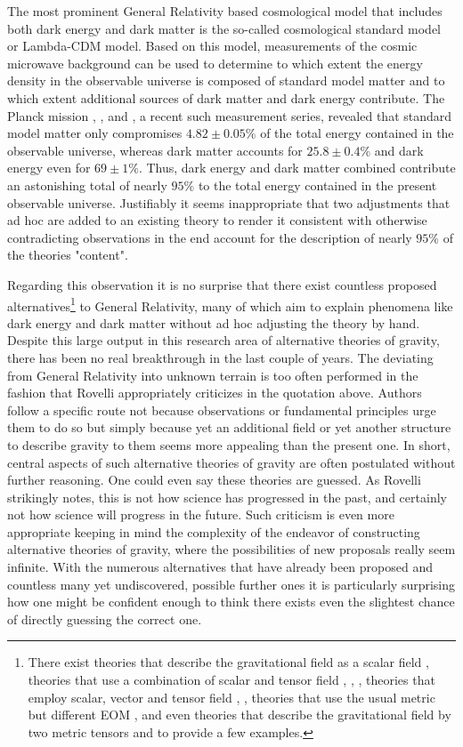 The most prominent General Relativity based cosmological model that includes both dark energy and dark matter is the so-called cosmological standard model or Lambda-CDM model. Based on this model, measurements of the cosmic microwave background can be used to determine to which extent the energy density in the observable universe is composed of standard model matter and to which extent additional sources of dark matter and dark energy contribute. The Planck mission \cite{Planck13_1}, \cite{Planck13_2}, \cite{Planck15} and \cite{Planck18}, a recent such measurement series, revealed that standard model matter only compromises $4.82\pm0.05\%$ of the total energy contained in the observable universe, whereas dark matter accounts for $ 25.8\pm0.4\%$ and dark energy even for $ 69 \pm 1 \%$. Thus, dark energy and dark matter combined contribute an astonishing total of nearly $95 \%$ to the total energy contained in the present observable universe.
Justifiably it seems inappropriate that two adjustments that ad hoc are added to an existing theory to render it consistent with otherwise contradicting observations in the end account for the description of nearly $95\%$ of the theories "content".  

Regarding this observation it is no surprise that there exist countless proposed alternatives\footnote{There exist theories that describe the gravitational field as a scalar field \cite{Scalar1} \cite{Scalar2}, theories that use a combination of scalar and tensor field \cite{ST1}, \cite{ST2}, \cite{ST3}, theories that employ scalar, vector and tensor field \cite{SVT1}, \cite{SVT2}, theories that use the usual metric but different EOM \cite{fR1}, \cite{fR2} and even theories that describe the gravitational field by two metric tensors \cite{BIM1} and \cite{BIM2} to provide a few examples.} to General Relativity, many of which aim to explain phenomena like dark energy and dark matter without ad hoc adjusting the theory by hand. 
Despite this large output in this research area of alternative theories of gravity, there has been no real breakthrough in the last couple of years. 
The deviating from General Relativity into unknown terrain is too often performed in the fashion that Rovelli appropriately criticizes in the quotation above. Authors follow a specific route not because observations or fundamental principles urge them to do so but simply because yet an additional field or yet another structure to describe gravity to them seems more appealing than the present one. In short, central aspects of such alternative theories of gravity are often postulated without further reasoning. One could even say these theories are guessed. As Rovelli strikingly notes, this is not how science has progressed in the past, and certainly not how science will progress in the future. Such criticism is even more appropriate keeping in mind the complexity of the endeavor of constructing alternative theories of gravity, where the possibilities of new proposals really seem infinite.
With the numerous alternatives that have already been proposed and countless many yet undiscovered, possible further ones it is particularly surprising how one might be confident enough to think there exists even the slightest chance of directly guessing the correct one. 

